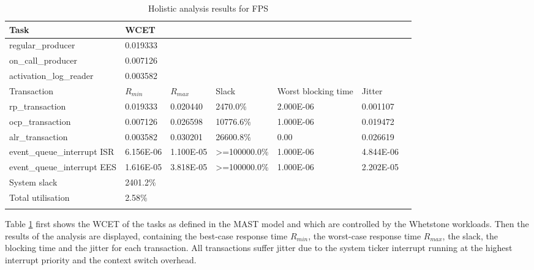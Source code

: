\documentclass{article}
\begin{document}
\begin{longtable}{lllllll}
   \toprule
   Task & WCET \\
   \midrule
   regular\_producer & 0.019333 \\
   on\_call\_producer & 0.007126 \\
   activation\_log\_reader & 0.003582 \\
   \toprule
   \toprule
   Transaction & $R_{min}$ & $R_{max}$ & Slack & Worst blocking time & Jitter \\
   \midrule
   rp\_transaction & 0.019333 & 0.020440  & 2470.0\% &  2.000E-06 & 0.001107 \\
   ocp\_transaction & 0.007126 & 0.026598 & 10776.6\% & 1.000E-06 & 0.019472 \\
   alr\_transaction & 0.003582 & 0.030201 & 26600.8\% & 0.00 & 0.026619 \\
   event\_queue\_interrupt ISR & 6.156E-06 & 1.100E-05 & >=100000.0\% & 1.000E-06 & 4.844E-06 \\
   event\_queue\_interrupt EES & 1.616E-05 & 3.818E-05 & >=100000.0\% & 1.000E-06 & 2.202E-05 \\
   \toprule
   \toprule
   System slack & 2401.2\% \\
   Total utilisation & 2.58\% \\
   \bottomrule
\caption{Holistic analysis results for FPS}
\label{tab:holistic-fps}
\end{longtable}

Table \ref{tab:holistic-fps} first shows the WCET of the tasks as defined in the MAST model and which are controlled by the Whetstone workloads. Then the results of the analysis are displayed, containing the best-case response time $R_{min}$, the worst-case response time $R_{max}$, the slack, the blocking time and the jitter for each transaction. All transactions suffer jitter due to the system ticker interrupt running at the highest interrupt priority and the context switch overhead.
\end{document}
